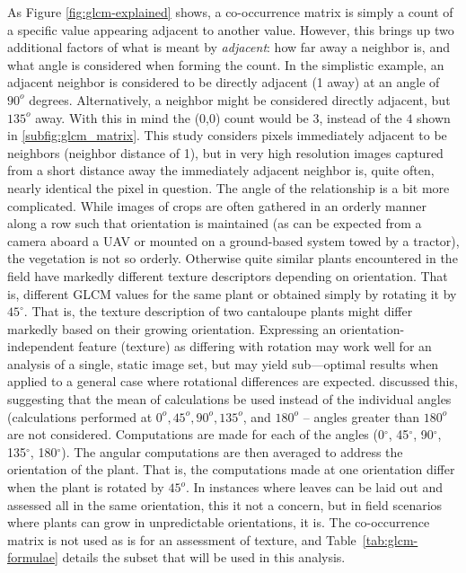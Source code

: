 \documentclass[letterpaper, notitlepage]{report}
\begin{document}
As Figure \ref{fig:glcm-explained} shows, a co-occurrence matrix is simply a count of a specific value appearing adjacent to another value. However, this brings up two additional factors of what is meant by \textit{adjacent}: how far away a neighbor is, and what angle is considered when forming the count. In the simplistic example, an adjacent neighbor is considered to be directly adjacent (1 away) at an angle of $90^o$ degrees. Alternatively, a neighbor might be considered directly adjacent, but $135^o$ away.  With this in mind the (0,0) count would be $3$, instead of the $4$ shown in \ref{subfig:glcm_matrix}. This study considers pixels immediately adjacent to be neighbors (neighbor distance of 1), but  in very high resolution images captured from a short distance away the immediately adjacent neighbor is, quite often, nearly identical the pixel in question. The angle of the relationship is a bit more complicated. While images of crops are often gathered in an orderly manner along a row such that orientation is maintained (as can be expected from a camera aboard a UAV or mounted on a ground-based system towed by a tractor), the vegetation is not so orderly. Otherwise quite similar plants encountered in the field have markedly different texture descriptors depending on orientation. That is, different GLCM values for the same plant or obtained simply by rotating it by $45^{\circ}$. That is, the texture description of two cantaloupe plants might differ markedly based on their growing orientation. Expressing an orientation-independent feature (texture) as differing with rotation may work well for an analysis of a single, static image set, but may yield sub---optimal results when applied to a general case where rotational differences are expected. \citeauthor*{Haralick1973-gr} discussed this, suggesting that the mean of calculations be used instead of the individual angles (calculations performed at $0^o, 45^o, 90^o, 135^o$, and $180^o$ -- angles greater than $180^o$ are not considered. Computations are made for each of the angles (0$^{\circ}$, 45$^{\circ}$, 90$^{\circ}$, 135$^{\circ}$, 180$^{\circ}$). The angular computations are then averaged to address the orientation of the plant. That is, the computations made at one orientation differ when the plant is rotated by $45^o$. In instances where leaves can be laid out and assessed all in the same orientation, this it not a concern, but in field scenarios where plants can grow in unpredictable orientations, it is. The co-occurrence matrix is not used as is for an assessment of texture, and Table~\ref{tab:glcm-formulae} details the subset that will be used in this analysis.
\end{document}
